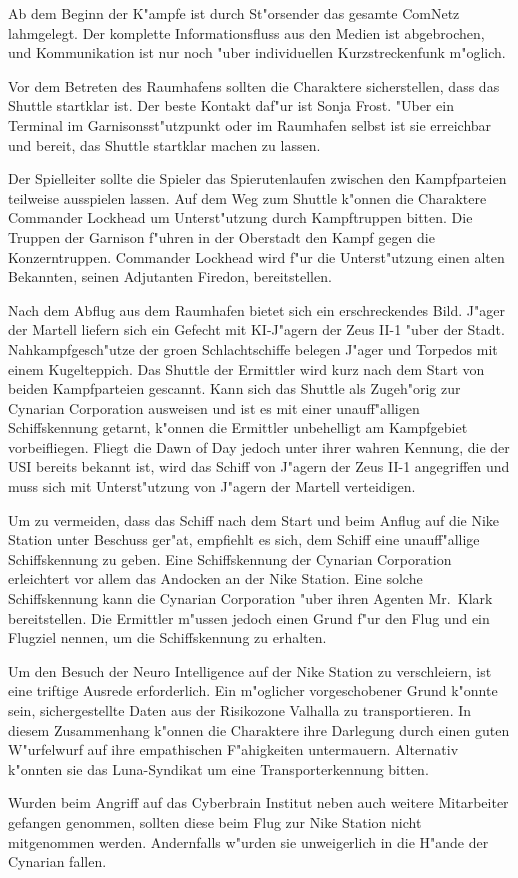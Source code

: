 Ab dem Beginn der K"ampfe ist durch St"orsender das gesamte ComNetz lahmgelegt. Der komplette Informationsfluss aus den Medien ist abgebrochen, und Kommunikation ist nur noch "uber individuellen Kurzstreckenfunk m"oglich.

Vor dem Betreten des Raumhafens sollten die Charaktere sicherstellen, dass das Shuttle startklar ist. Der beste Kontakt daf"ur ist Sonja Frost. "Uber ein Terminal im Garnisonsst"utzpunkt oder im Raumhafen selbst ist sie erreichbar und bereit, das Shuttle startklar machen zu lassen.

Der Spielleiter sollte die Spieler das Spie\3rutenlaufen zwischen den Kampfparteien teilweise ausspielen lassen. Auf dem Weg zum Shuttle k"onnen die Charaktere Commander Lockhead um Unterst"utzung durch Kampftruppen bitten. Die Truppen der Garnison f"uhren in der Oberstadt den Kampf gegen die Konzerntruppen. Commander Lockhead wird f"ur die Unterst"utzung einen alten Bekannten, seinen Adjutanten Firedon, bereitstellen.

Nach dem Abflug aus dem Raumhafen bietet sich ein erschreckendes Bild. J"ager der Martell liefern sich ein Gefecht mit KI-J"agern der Zeus II-1 "uber der Stadt. Nahkampfgesch"utze der gro\3en Schlachtschiffe belegen J"ager und Torpedos mit einem Kugelteppich. Das Shuttle der Ermittler wird kurz nach dem Start von beiden Kampfparteien gescannt. Kann sich das Shuttle als Zugeh"orig zur Cynarian Corporation ausweisen und ist es mit einer unauff"alligen Schiffskennung getarnt, k"onnen die Ermittler unbehelligt am Kampfgebiet vorbeifliegen. Fliegt die Dawn of Day jedoch unter ihrer wahren Kennung, die der USI bereits bekannt ist, wird das Schiff von J"agern der Zeus II-1 angegriffen und muss sich mit Unterst"utzung von J"agern der Martell verteidigen.

Um zu vermeiden, dass das Schiff nach dem Start und beim Anflug auf die Nike Station unter Beschuss ger"at, empfiehlt es sich, dem Schiff eine unauff"allige Schiffskennung zu geben. Eine Schiffskennung der Cynarian Corporation erleichtert vor allem das Andocken an der Nike Station. Eine solche Schiffskennung kann die Cynarian Corporation "uber ihren Agenten Mr.~Klark bereitstellen. Die Ermittler m"ussen jedoch einen Grund f"ur den Flug und ein Flugziel nennen, um die Schiffskennung zu erhalten.

Um den Besuch der Neuro Intelligence auf der Nike Station zu verschleiern, ist eine triftige Ausrede erforderlich. Ein m"oglicher vorgeschobener Grund k"onnte sein, sichergestellte Daten aus der Risikozone Valhalla zu transportieren. In diesem Zusammenhang k"onnen die Charaktere ihre Darlegung durch einen guten W"urfelwurf auf ihre empathischen F"ahigkeiten untermauern. Alternativ k"onnten sie das Luna-Syndikat um eine Transporterkennung bitten.

\begin{remarks}
    Wurden beim Angriff auf das Cyberbrain Institut neben \ml{} auch weitere Mitarbeiter gefangen genommen, sollten diese beim Flug zur Nike Station nicht mitgenommen werden. Andernfalls w"urden sie unweigerlich in die H"ande der Cynarian fallen.
\end{remarks}
